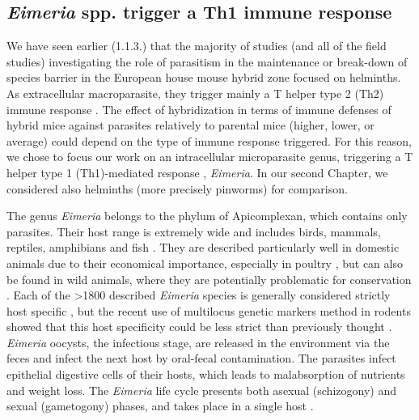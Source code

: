 \subsection{\textit{Eimeria} spp. trigger a Th1 immune response}
We have seen earlier (1.1.3.) that the majority of studies (and all of the field studies) investigating the role of parasitism in the maintenance or break-down of species barrier in the European house mouse hybrid zone focused on helminths. As extracellular macroparasite, they trigger mainly a T helper type 2 (Th2) immune response \citep{sher_regulation_1992}. The effect of hybridization in terms of immune defenses of hybrid mice against parasites relatively to parental mice (higher, lower, or average) could depend on the type of immune response triggered. For this reason, we chose to focus our work on an intracellular microparasite genus, triggering a T helper type 1 (Th1)-mediated response \citep{sher_regulation_1992}, \textit{Eimeria}. In our second Chapter, we considered also helminths (more precisely pinworms) for comparison.
\par
The genus \textit{Eimeria} belongs to the phylum of Apicomplexan, which contains only parasites. Their host range is extremely wide and includes birds, mammals, reptiles, amphibians and fish \citep{chapman_chapter_2013}. They are described particularly well in domestic animals due to their economical importance, especially in poultry \citep{blake_securing_2014}, but can also be found in wild animals, where they are potentially problematic for conservation \parencite{jeanes_two_2013, knowles_stability_2013, matsubayashi_molecular_2018}. Each of the >1800 described \textit{Eimeria} species is generally considered strictly host specific \citep{duszynski_eimeria_2011}, but the recent use of multilocus genetic markers method in rodents showed that this host specificity could be less strict than previously thought \citep{jarquin-diaz_generalist_2020}. \textit{Eimeria} oocysts, the infectious stage, are released in the environment via the feces and infect the next host by oral-fecal contamination. The parasites infect epithelial digestive cells of their hosts, which leads to malabsorption of nutrients and weight loss. The \textit{Eimeria} life cycle presents both asexual (schizogony) and sexual (gametogony) phases, and takes place in a single host \citep{burrell_life_2019}.
\par

